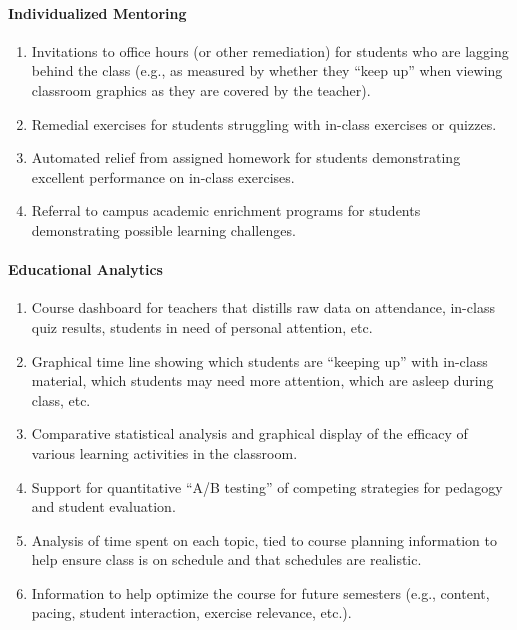 \documentclass{article}
\begin{document}
\paragraph{Individualized Mentoring}
\begin{enumerate}
\item Invitations to office hours (or other remediation)
  for students who are lagging behind the class
  (e.g., as measured by whether they ``keep up''
  when viewing classroom graphics
  as they are covered by the teacher).
\item Remedial exercises for students
  struggling with in-class exercises or quizzes.
\item Automated relief from assigned homework for students demonstrating
  excellent performance on in-class exercises.
\item Referral to campus academic enrichment programs for students
  demonstrating possible learning challenges.
\end{enumerate}

\paragraph{Educational Analytics}
\begin{enumerate}
\item Course dashboard for teachers
  that distills raw data on attendance,
  in-class quiz results,
  students in need of personal attention, etc.
\item Graphical time line
  showing which students are ``keeping up''
  with in-class material,
  which students may need more attention,
  which are asleep during class, etc.
\item
  Comparative statistical analysis
  and graphical display
  of the efficacy of various learning activities
  in the classroom.
\item
  Support for
  quantitative ``A/B testing''
  of competing strategies
  for pedagogy and student evaluation.
\item
  Analysis of time spent on each topic,
  tied to course planning information
  to help ensure class is on schedule
  and that schedules are realistic.
\item
  Information to help optimize the course
  for future semesters
  (e.g., content, pacing, student interaction, exercise relevance, etc.).
\end{enumerate}
\end{document}
